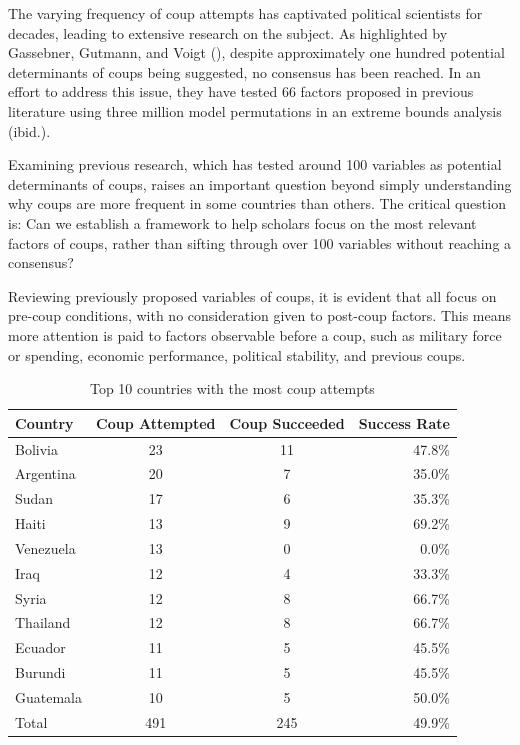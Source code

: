 \documentclass[
  12pt,
]{report}
\begin{document}
The varying frequency of coup attempts has captivated political
scientists for decades, leading to extensive research on the subject. As
highlighted by Gassebner, Gutmann, and Voigt
(), despite approximately one hundred
potential determinants of coups being suggested, no consensus has been
reached. In an effort to address this issue, they have tested 66 factors
proposed in previous literature using three million model permutations
in an extreme bounds analysis (ibid.).

Examining previous research, which has tested around 100 variables as
potential determinants of coups, raises an important question beyond
simply understanding why coups are more frequent in some countries than
others. The critical question is: Can we establish a framework to help
scholars focus on the most relevant factors of coups, rather than
sifting through over 100 variables without reaching a consensus?

Reviewing previously proposed variables of coups, it is evident that all
focus on pre-coup conditions, with no consideration given to post-coup
factors. This means more attention is paid to factors observable before
a coup, such as military force or spending, economic performance,
political stability, and previous coups.

\begingroup
\setlength{}
\setlength{}\fontsize{12.0pt}{14.4pt}\selectfont
\setlength{\LTpost}{0mm}

\begin{longtable}{@{\extracolsep{\fill}}lccr}

\caption{\label{tbl-coups}Top 10 countries with the most coup attempts}

\tabularnewline

\toprule
Country & Coup Attempted & Coup Succeeded & Success Rate \\ 
\midrule\addlinespace[2.5pt]
Bolivia & 23 & 11 & 47.8\% \\ 
Argentina & 20 & 7 & 35.0\% \\ 
Sudan & 17 & 6 & 35.3\% \\ 
Haiti & 13 & 9 & 69.2\% \\ 
Venezuela & 13 & 0 & 0.0\% \\ 
Iraq & 12 & 4 & 33.3\% \\ 
Syria & 12 & 8 & 66.7\% \\ 
Thailand & 12 & 8 & 66.7\% \\ 
Ecuador & 11 & 5 & 45.5\% \\ 
Burundi & 11 & 5 & 45.5\% \\ 
Guatemala & 10 & 5 & 50.0\% \\ 
Total & 491 & 245 & 49.9\% \\ 
\bottomrule

\end{longtable}
\end{document}
